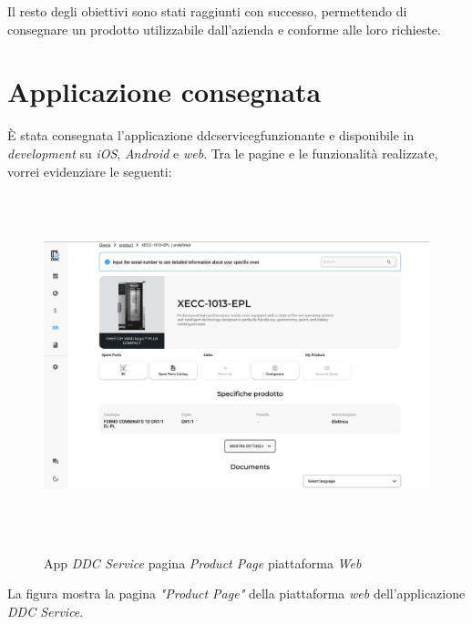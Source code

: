 Il resto degli obiettivi sono stati raggiunti con successo, permettendo di consegnare un prodotto utilizzabile dall'azienda e conforme alle loro richieste.

\section{Applicazione consegnata}

È stata consegnata l'applicazione \gls{ddcserviceg}\glox funzionante e disponibile in \textit{development} su \textit{iOS}, \textit{Android} e \textit{web}.
Tra le pagine e le funzionalità realizzate, vorrei evidenziare le seguenti:

\begin{figure}[H]
    \centering
    \includegraphics[alt={Screenshot della pagina \textit{"Product Page"} su piattaforma \textit{web}}, height=10cm]{img/ProductPageWeb}
    \caption{App \textit{DDC Service} pagina \textit{Product Page} piattaforma \textit{Web}}
    \label{fig:productpageweb}
\end{figure}

La figura mostra la pagina \textit{"Product Page"} della piattaforma \textit{web} dell'applicazione \textit{DDC Service}.


